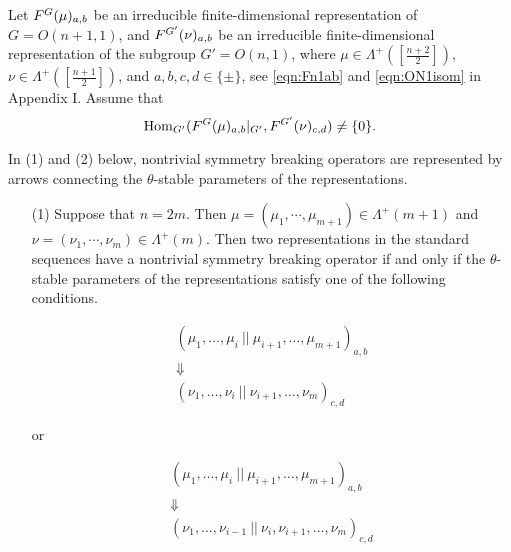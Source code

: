 \begin{conjecture}
\label{conj:V2}
Let $F^{{G}}({\mu})_{a,b}$ be an irreducible finite-dimensional representation of $G=O(n+1,1)$, 
 and $F^{{G'}}({\nu})_{a,b}$ be an irreducible finite-dimensional representation of the subgroup $G'=O(n,1)$, 
 where $\mu \in \Lambda^+([\frac{n+2}{2}])$, 
 $\nu \in \Lambda^+([\frac{n+1}{2}])$, 
 and $a,b,c,d \in \{\pm\}$, 
 see \eqref{eqn:Fn1ab} and \eqref{eqn:ON1isom} in Appendix I.  
Assume that 
\begin{equation}
\label{eqn:fdabcd}
  {\operatorname{Hom}}_{G'} (F^{{G}}({\mu})_{a,b}|_{G'}, F^{{G'}}({\nu})_{c,d})\not = \{0\}.
\end{equation}


In (1) and (2) below, 
 nontrivial symmetry breaking operators are represented by arrows connecting the $\theta$-stable parameters of the representations.


\begin{enumerate}
\item
[{\rm{(1)}}]  
Suppose that $n=2m$.  
Then $\mu =(\mu_1, \cdots, \mu_{m+1})\in \Lambda^+(m+1)$
 and $\nu =(\nu_1, \cdots, \nu_{m})\in \Lambda^+(m)$.  
Then two  representations in the standard sequences have a nontrivial symmetry breaking operator if and only if the $\theta$-stable parameters of the representations satisfy one of the following conditions.

\begin{eqnarray*}
& (\mu_{1}, \dots , \mu_i ~|| ~\mu_{i+1} , \dots , \mu_{m+1})_{a,b}& \\
& \Downarrow &  \\
 &       (\nu_1 , \dots  ,\nu_i ~ ||~ \nu_{i+1}, \dots ,\nu_{m}  )_{c,d}
 \end{eqnarray*}
 \begin{center}
                      or
  \end{center}                    
\begin{eqnarray*}
& (\mu_{1}, \dots , \mu_i ~|| ~\mu_{i+1} , \dots , \mu_{m+1})_{a,b}&  
\\
& \Downarrow &  \\
&     (\nu_1, \dots  ,\nu_{i-1} ~ ||~ \nu_i, \nu_{i+1}, \dots ,\nu_{m})_{c,d} &
\end{eqnarray*}        


\end{enumerate}
\end{conjecture}
